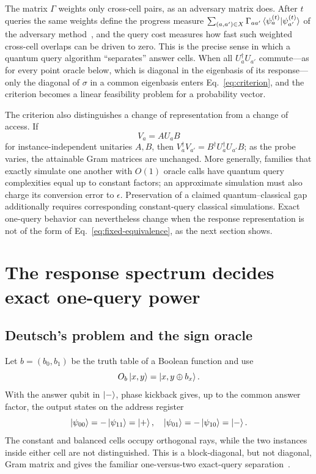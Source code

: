 \documentclass[
  aps,
  pra,
  reprint,
  nofootinbib
]{revtex4-2}
\begin{document}
The matrix \(\Gamma\) weights only cross-cell pairs, as an adversary matrix
does. After \(t\) queries the same weights define the progress measure
\(\sum_{(a,a')\in X}\Gamma_{aa'}\braket{\psi_a^{(t)}|\psi_{a'}^{(t)}}\) of the
adversary method~\cite{Ambainis2002Adversary}, and the query cost measures how
fast such weighted cross-cell overlaps can be driven to zero. This is the
precise sense in which a quantum query algorithm ``separates'' answer cells.
When all \(U_a^\dagger U_{a'}\) commute---as for every point oracle below, which
is diagonal in the eigenbasis of its response---only the diagonal of \(\sigma\)
in a common eigenbasis enters Eq.~\eqref{eq:criterion}, and the criterion
becomes a linear feasibility problem for a probability vector.

The criterion also distinguishes a change of representation from a change of
access. If
\begin{equation}
 V_a=A U_a B
 \label{eq:fixed-equivalence}
\end{equation}
for instance-independent unitaries \(A,B\), then
\(V_a^\dagger V_{a'}=B^\dagger U_a^\dagger U_{a'}B\); as the probe varies, the
attainable Gram matrices are unchanged. More generally, families that exactly
simulate one another with \(O(1)\) oracle calls have quantum query
complexities equal up to constant factors; an approximate simulation must also
charge its conversion error to \(\epsilon\). Preservation of a claimed
quantum--classical gap additionally requires corresponding constant-query
classical simulations. Exact one-query behavior can nevertheless change when
the response representation is not of the form of
Eq.~\eqref{eq:fixed-equivalence}, as the next section shows.

\section{The response spectrum decides exact one-query power}
\label{sec:spectrum}

\subsection{Deutsch's problem and the sign oracle}

Let \(b=(b_0,b_1)\) be the truth table of a Boolean function and use
\begin{equation}
 O_b\ket{x,y}=\ket{x,y\oplus b_x}.
 \label{eq:xor-oracle}
\end{equation}
With the answer qubit in \(\ket-\), phase kickback gives, up to the common
answer factor, the output states on the address register
\begin{equation}
 \ket{\psi_{00}} = -\ket{\psi_{11}} = \ket{+},\quad
 \ket{\psi_{01}} = -\ket{\psi_{10}} = \ket{-}.
 \label{eq:deutsch-rays}
\end{equation}
The constant and balanced cells occupy orthogonal rays, while the two instances
inside either cell are not distinguished. This is a block-diagonal, but not
diagonal, Gram matrix and gives the familiar one-versus-two exact-query
separation~\cite{deutsch,deutsch:92,cleve:98}.
\end{document}
